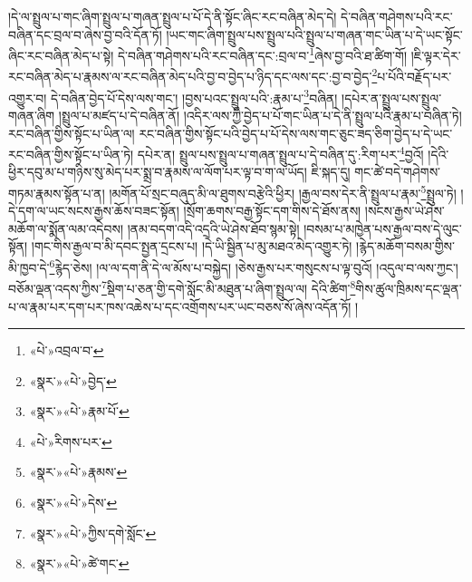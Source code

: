 །དེ་ལ་སྤྲུལ་པ་གང་ཞིག་སྤྲུལ་པ་གཞན་སྤྲུལ་པ་པོ་དེ་ནི་སྟོང་ཞིང་རང་བཞིན་མེད་དེ། དེ་བཞིན་གཤེགས་པའི་རང་བཞིན་དང་བྲལ་བ་ཞེས་བྱ་བའི་དོན་ཏོ། །ཡང་གང་ཞིག་སྤྲུལ་པས་སྤྲུལ་པའི་སྤྲུལ་པ་གཞན་གང་ཡིན་པ་དེ་ཡང་སྟོང་ཞིང་རང་བཞིན་མེད་པ་སྟེ། དེ་བཞིན་གཤེགས་པའི་རང་བཞིན་དང་:བྲལ་བ་\footnote{«པེ་»འབྲལ་བ་}ཞེས་བྱ་བའི་ཐ་ཚིག་གོ། །ཇི་ལྟར་དེར་རང་བཞིན་མེད་པ་རྣམས་ལ་རང་བཞིན་མེད་པའི་བྱ་བ་བྱེད་པ་ཉིད་དང་ལས་དང་:བྱ་བ་བྱེད་\footnote{«སྣར་»«པེ་»བྱེད་}པ་པོའི་བརྗོད་པར་འགྱུར་བ། དེ་བཞིན་བྱེད་པོ་དེས་ལས་གང་། །བྱས་པའང་སྤྲུལ་པའི་:རྣམ་པ་\footnote{«སྣར་»«པེ་»རྣམ་པོ་}བཞིན། །དཔེར་ན་སྤྲུལ་པས་སྤྲུལ་གཞན་ཞིག །སྤྲུལ་པ་མཛད་པ་དེ་བཞིན་ནོ། །འདིར་ལས་ཀྱི་བྱེད་པ་པོ་གང་ཡིན་པ་དེ་ནི་སྤྲུལ་པའི་རྣམ་པ་བཞིན་ཏེ། རང་བཞིན་གྱིས་སྟོང་པ་ཡིན་ལ། རང་བཞིན་གྱིས་སྟོང་པའི་བྱེད་པ་པོ་དེས་ལས་གང་ཅུང་ཟད་ཅིག་བྱེད་པ་དེ་ཡང་རང་བཞིན་གྱིས་སྟོང་པ་ཡིན་ཏེ། དཔེར་ན། སྤྲུལ་པས་སྤྲུལ་པ་གཞན་སྤྲུལ་པ་དེ་བཞིན་དུ་:རིག་པར་\footnote{«པེ་»རིགས་པར་}བྱའོ། །དེའི་ཕྱིར་དབུ་མ་པ་གཉིས་སུ་མེད་པར་སྨྲ་བ་རྣམས་ལ་ལོག་པར་ལྟ་བ་ག་ལ་ཡོད། ཇི་སྐད་དུ། གང་ཚེ་བདེ་གཤེགས་གཏམ་རྣམས་སྟོན་པ་ན། །མགོན་པོ་སྲང་བཞུད་མི་ལ་ཐུགས་བརྩེའི་ཕྱིར། །རྒྱལ་བས་དེར་ནི་སྤྲུལ་པ་རྣམ་\footnote{«སྣར་»«པེ་»རྣམས་}སྤྲུལ་ཏེ། །དེ་དག་ལ་ཡང་སངས་རྒྱས་ཆོས་བཟང་སྟོན། །སྲོག་ཆགས་བརྒྱ་སྟོང་དག་གིས་དེ་ཐོས་ནས། །སངས་རྒྱས་ཡེ་ཤེས་མཆོག་ལ་སྨོན་ལམ་འདེབས། །ནམ་བདག་འདི་འདྲའི་ཡེ་ཤེས་ཐོབ་སྙམ་སྟེ། །བསམ་པ་མཁྱེན་པས་རྒྱལ་བས་དེ་ལུང་སྟོན། །གང་གིས་རྒྱལ་བ་མི་དབང་སྤྱན་དྲངས་པ། །དེ་ཡི་སྦྱིན་པ་མུ་མཐའ་མེད་འགྱུར་ཏེ། །རྙེད་མཆོག་བསམ་གྱིས་མི་ཁྱབ་དེ་\footnote{«སྣར་»«པེ་»དེས་}རྙེད་ཅེས། །ལ་ལ་དག་ནི་དེ་ལ་མོས་པ་བསྐྱེད། །ཅེས་རྒྱས་པར་གསུངས་པ་ལྟ་བུའོ། །འདུལ་བ་ལས་ཀྱང་། བཅོམ་ལྡན་འདས་ཀྱིས་\footnote{«སྣར་»«པེ་»ཀྱིས་དགེ་སློང་}སྡིག་པ་ཅན་གྱི་དགེ་སློང་མི་མཐུན་པ་ཞིག་སྤྲུལ་ལ། དེའི་ཚིག་\footnote{«སྣར་»«པེ་»ཚེ་གང་}གིས་ཚུལ་ཁྲིམས་དང་ལྡན་པ་ལ་རྣམ་པར་དག་པར་ཁས་འཆེས་པ་དང་འགྲོགས་པར་ཡང་བཅས་སོ་ཞེས་འདོན་ཏོ། །
